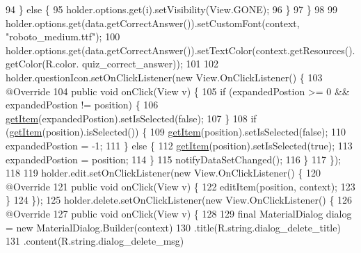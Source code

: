 \begin{DoxyCode}
94             \} \textcolor{keywordflow}{else} \{
95                 holder.options.get(i).setVisibility(View.GONE);
96             \}
97         \}
98 
99         holder.options.get(data.getCorrectAnswer()).setCustomFont(context, \textcolor{stringliteral}{"roboto\_medium.ttf"});
100         holder.options.get(data.getCorrectAnswer()).setTextColor(context.getResources().getColor(R.color.
      quiz\_correct\_answer));
101 
102         holder.questionIcon.setOnClickListener(\textcolor{keyword}{new} View.OnClickListener() \{
103             @Override
104             \textcolor{keyword}{public} \textcolor{keywordtype}{void} onClick(View v) \{
105                 \textcolor{keywordflow}{if} (expandedPostion >= 0 && expandedPostion != position) \{
106                     \hyperlink{classorg_1_1buildmlearn_1_1toolkit_1_1templates_1_1QuizAdapter_add9307def1c611fefc1d255724488c1a}{getItem}(expandedPostion).setIsSelected(\textcolor{keyword}{false});
107                 \}
108                 \textcolor{keywordflow}{if} (\hyperlink{classorg_1_1buildmlearn_1_1toolkit_1_1templates_1_1QuizAdapter_add9307def1c611fefc1d255724488c1a}{getItem}(position).isSelected()) \{
109                     \hyperlink{classorg_1_1buildmlearn_1_1toolkit_1_1templates_1_1QuizAdapter_add9307def1c611fefc1d255724488c1a}{getItem}(position).setIsSelected(\textcolor{keyword}{false});
110                     expandedPostion = -1;
111                 \} \textcolor{keywordflow}{else} \{
112                     \hyperlink{classorg_1_1buildmlearn_1_1toolkit_1_1templates_1_1QuizAdapter_add9307def1c611fefc1d255724488c1a}{getItem}(position).setIsSelected(\textcolor{keyword}{true});
113                     expandedPostion = position;
114                 \}
115                 notifyDataSetChanged();
116             \}
117         \});
118 
119         holder.edit.setOnClickListener(\textcolor{keyword}{new} View.OnClickListener() \{
120             @Override
121             \textcolor{keyword}{public} \textcolor{keywordtype}{void} onClick(View v) \{
122                 editItem(position, context);
123             \}
124         \});
125         holder.delete.setOnClickListener(\textcolor{keyword}{new} View.OnClickListener() \{
126             @Override
127             \textcolor{keyword}{public} \textcolor{keywordtype}{void} onClick(View v) \{
128 
129                 \textcolor{keyword}{final} MaterialDialog dialog = \textcolor{keyword}{new} MaterialDialog.Builder(context)
130                         .title(R.string.dialog\_delete\_title)
131                         .content(R.string.dialog\_delete\_msg)

\end{DoxyCode}
